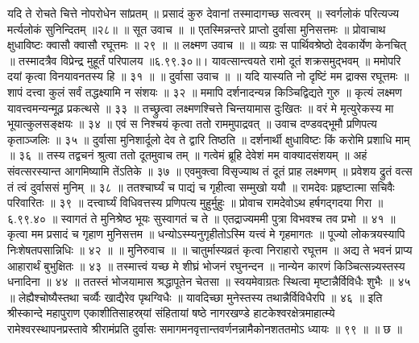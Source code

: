 यदि ते रोचते चित्ते नोपरोधेन सांप्रतम् ॥
प्रसादं कुरु देवानां तस्मादागच्छ सत्वरम् ॥
स्वर्गलोकं परित्यज्य मर्त्यलोकं सुनिन्दितम् ॥२८॥
॥ सूत उवाच ॥ ॥
एतस्मिन्नन्तरे प्राप्तो दुर्वासा मुनिसत्तमः ॥
प्रोवाचाथ क्षुधाविष्टः क्वासौ क्वासौ रघूत्तमः ॥ २९ ॥
॥ लक्ष्मण उवाच ॥ ॥
व्यग्रः स पार्थिवश्रेष्ठो देवकार्येण केनचित् ॥
तस्मादत्रैव विप्रेन्द्र मुहूर्तं परिपालय ॥६.९९.३०॥।
यावत्सान्त्वयते रामो दूतं शक्रसमुद्भवम् ॥
ममोपरि दयां कृत्वा विनयावनतस्य हि ॥ ३१ ॥
॥ दुर्वासा उवाच ॥ ॥
यदि यास्यति नो दृष्टिं मम द्राक्स रघूत्तमः ॥
शापं दत्त्वा कुलं सर्वं तद्धक्ष्यामि न संशयः ॥ ३२ ॥
ममापि दर्शनादन्यन्न किञ्चिद्विद्यते गुरु ॥
कृत्यं लक्ष्मण यावत्त्वमन्यन्मूढ़ प्रकत्थसे ॥ ३३ ॥
तच्छ्रुत्वा लक्ष्मणश्चित्ते चिन्तयामास दुःखितः ॥
वरं मे मृत्युरेकस्य मा भूयात्कुलसङ्क्षयः ॥ ३४ ॥
एवं स निश्चयं कृत्वा ततो राममुपाद्रवत् ॥
उवाच दण्डवद्भूमौ प्रणिपत्य कृताञ्जलिः ॥ ३५ ॥
दुर्वासा मुनिशार्दूलो देव ते द्वारि तिष्ठति ॥
दर्शनार्थी क्षुधाविष्टः किं करोमि प्रशाधि माम् ॥ ३६ ॥
तस्य तद्वचनं श्रुत्वा ततो दूतमुवाच तम् ॥
गत्वेमं ब्रूहि देवेशं मम वाक्यादसंशयम् ॥
अहं संवत्सरस्यान्त आगमिष्यामि तेंऽतिके ॥ ३७ ॥
एवमुक्त्वा विसृज्याथ तं दूतं प्राह लक्ष्मणम् ॥
प्रवेशय द्रुतं वत्स तं त्वं दुर्वाससं मुनिम् ॥ ३८ ॥
ततश्चार्घ्यं च पाद्यं च गृहीत्वा सम्मुखो ययौ ॥
रामदेवः प्रहृष्टात्मा सचिवैः परिवारितः ॥ ३९ ॥
दत्त्वार्घ्यं विधिवत्तस्य प्रणिपत्य मुहुर्मुहुः ॥
प्रोवाच रामदेवोऽथ हर्षगद्गदया गिरा ॥ ६.९९.४० ॥
स्वागतं ते मुनिश्रेष्ठ भूयः सुस्वागतं च ते ॥
एतद्राज्यममी पुत्रा विभवश्च तव प्रभो ॥ ४१ ॥
कृत्वा मम प्रसादं च गृहाण मुनिसत्तम ॥
धन्योऽस्म्यनुगृहीतोऽस्मि यत्त्वं मे गृहमागतः ॥
पूज्यो लोकत्रयस्यापि निःशेषतपसान्निधिः ॥ ४२ ॥
॥ मुनिरुवाच ॥ ॥
चातुर्मास्यव्रतं कृत्वा निराहारो रघूत्तम ॥
अद्य ते भवनं प्राप्य आहारार्थं बुभुक्षितः ॥ ४३ ॥
तस्मात्त्वं यच्छ मे शीघ्रं भोजनं रघुनन्दन ॥
नान्येन कारणं किञ्चित्सन्न्यस्तस्य धनादिना ॥ ४४ ॥
ततस्तं भोजयामास श्रद्धापूतेन चेतसा ॥
स्वयमेवाग्रतः स्थित्वा मृष्टान्नैर्विविधैः शुभैः ॥ ४५ ॥
लेह्यैश्चोष्यैस्तथा चर्व्यैः खाद्यैरेव पृथग्विधैः ॥
यावदिच्छा मुनेस्तस्य तथान्नैर्विविधैरपि ॥ ४६ ॥
इति श्रीस्कान्दे महापुराण एकाशीतिसाहस्र्यां संहितायां षष्ठे नागरखण्डे हाटकेश्वरक्षेत्रमाहात्म्ये रामेश्वरस्थापनप्रस्तावे श्रीरामंप्रति दुर्वासः समागमनवृत्तान्तवर्णनन्नामैकोनशततमोऽ ध्यायः ॥ ९९ ॥ ॥ छ ॥


